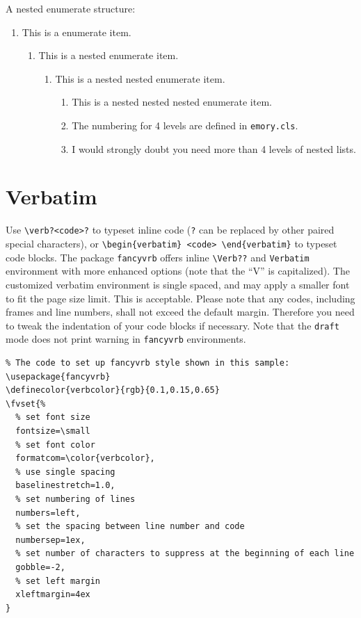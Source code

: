 \documentclass[final]{emory}
\begin{document}
A nested enumerate structure:
\begin{enumerate}
  \item This is a enumerate item.
  \begin{enumerate}
    \item This is a nested enumerate item.
    \begin{enumerate}
      \item This is a nested nested enumerate item.
      \begin{enumerate}
        \item This is a nested nested nested enumerate item. 
        \item The numbering for 4 levels are defined in \Verb|emory.cls|.
        \item I would strongly doubt you need more than 4 levels of nested lists.
      \end{enumerate}
    \end{enumerate}
  \end{enumerate}    
\end{enumerate}

\section{Verbatim}

Use \Verb|\verb?<code>?| to typeset inline code  (\Verb|?| can be replaced by
other paired special characters),
or  \Verb|\begin{verbatim} <code> \end{verbatim}| to typeset code blocks.
The package \Verb|fancyvrb| offers inline \Verb|\Verb??| and \Verb|Verbatim| environment with more enhanced
options (note that the ``V'' is capitalized). The customized verbatim environment is single spaced, and may
apply a smaller font to fit the page size limit. This is acceptable.
Please note that any codes, including frames and line numbers, shall not
exceed the default margin. Therefore you need to tweak the indentation of your code blocks if necessary.
Note that the \Verb|draft| mode does not print warning in \Verb|fancyvrb| environments.

\begin{Verbatim}
% The code to set up fancyvrb style shown in this sample:
\usepackage{fancyvrb}
\definecolor{verbcolor}{rgb}{0.1,0.15,0.65}
\fvset{%
  % set font size
  fontsize=\small
  % set font color
  formatcom=\color{verbcolor},	
  % use single spacing
  baselinestretch=1.0,
  % set numbering of lines				  
  numbers=left,									
  % set the spacing between line number and code
  numbersep=1ex,
  % set number of characters to suppress at the beginning of each line
  gobble=-2,
  % set left margin
  xleftmargin=4ex
}
\end{Verbatim}
\end{document}
